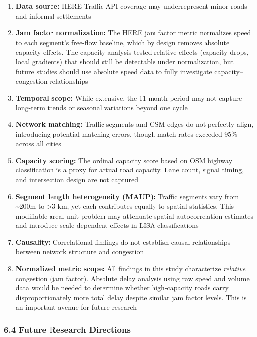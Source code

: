 \documentclass[
  12pt,
]{article}
\providecommand{\tightlist}{%
  \setlength{\itemsep}{0pt}\setlength{\parskip}{0pt}}
\begin{document}
\begin{enumerate}
\def\labelenumi{\arabic{enumi}.}
\tightlist
\item
  \textbf{Data source:} HERE Traffic API coverage may underrepresent minor roads and informal settlements
\item
  \textbf{Jam factor normalization:} The HERE jam factor metric normalizes speed to each segment's free-flow baseline, which by design removes absolute capacity effects. The capacity analysis tested relative effects (capacity drops, local gradients) that should still be detectable under normalization, but future studies should use absolute speed data to fully investigate capacity--congestion relationships
\item
  \textbf{Temporal scope:} While extensive, the 11-month period may not capture long-term trends or seasonal variations beyond one cycle
\item
  \textbf{Network matching:} Traffic segments and OSM edges do not perfectly align, introducing potential matching errors, though match rates exceeded 95\% across all cities
\item
  \textbf{Capacity scoring:} The ordinal capacity score based on OSM highway classification is a proxy for actual road capacity. Lane count, signal timing, and intersection design are not captured
\item
  \textbf{Segment length heterogeneity (MAUP):} Traffic segments vary from \textasciitilde200m to \textgreater3 km, yet each contributes equally to spatial statistics. This modifiable areal unit problem may attenuate spatial autocorrelation estimates and introduce scale-dependent effects in LISA classifications
\item
  \textbf{Causality:} Correlational findings do not establish causal relationships between network structure and congestion
\item
  \textbf{Normalized metric scope:} All findings in this study characterize \emph{relative} congestion (jam factor). Absolute delay analysis using raw speed and volume data would be needed to determine whether high-capacity roads carry disproportionately more total delay despite similar jam factor levels. This is an important avenue for future research
\end{enumerate}

\subsubsection{6.4 Future Research Directions}\label{future-research-directions}
\end{document}
